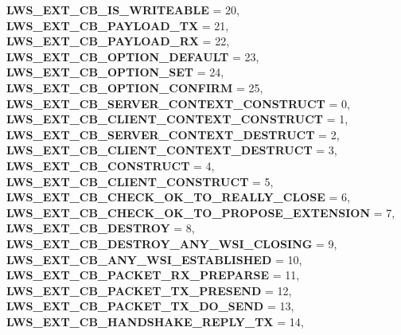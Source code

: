 \begin{DoxyCompactItemize}
\newline
{\bfseries L\+W\+S\+\_\+\+E\+X\+T\+\_\+\+C\+B\+\_\+\+I\+S\+\_\+\+W\+R\+I\+T\+E\+A\+B\+LE} = 20, 
{\bfseries L\+W\+S\+\_\+\+E\+X\+T\+\_\+\+C\+B\+\_\+\+P\+A\+Y\+L\+O\+A\+D\+\_\+\+TX} = 21, 
{\bfseries L\+W\+S\+\_\+\+E\+X\+T\+\_\+\+C\+B\+\_\+\+P\+A\+Y\+L\+O\+A\+D\+\_\+\+RX} = 22, 
{\bfseries L\+W\+S\+\_\+\+E\+X\+T\+\_\+\+C\+B\+\_\+\+O\+P\+T\+I\+O\+N\+\_\+\+D\+E\+F\+A\+U\+LT} = 23, 
\newline
{\bfseries L\+W\+S\+\_\+\+E\+X\+T\+\_\+\+C\+B\+\_\+\+O\+P\+T\+I\+O\+N\+\_\+\+S\+ET} = 24, 
{\bfseries L\+W\+S\+\_\+\+E\+X\+T\+\_\+\+C\+B\+\_\+\+O\+P\+T\+I\+O\+N\+\_\+\+C\+O\+N\+F\+I\+RM} = 25, 
{\bfseries L\+W\+S\+\_\+\+E\+X\+T\+\_\+\+C\+B\+\_\+\+S\+E\+R\+V\+E\+R\+\_\+\+C\+O\+N\+T\+E\+X\+T\+\_\+\+C\+O\+N\+S\+T\+R\+U\+CT} = 0, 
{\bfseries L\+W\+S\+\_\+\+E\+X\+T\+\_\+\+C\+B\+\_\+\+C\+L\+I\+E\+N\+T\+\_\+\+C\+O\+N\+T\+E\+X\+T\+\_\+\+C\+O\+N\+S\+T\+R\+U\+CT} = 1, 
\newline
{\bfseries L\+W\+S\+\_\+\+E\+X\+T\+\_\+\+C\+B\+\_\+\+S\+E\+R\+V\+E\+R\+\_\+\+C\+O\+N\+T\+E\+X\+T\+\_\+\+D\+E\+S\+T\+R\+U\+CT} = 2, 
{\bfseries L\+W\+S\+\_\+\+E\+X\+T\+\_\+\+C\+B\+\_\+\+C\+L\+I\+E\+N\+T\+\_\+\+C\+O\+N\+T\+E\+X\+T\+\_\+\+D\+E\+S\+T\+R\+U\+CT} = 3, 
{\bfseries L\+W\+S\+\_\+\+E\+X\+T\+\_\+\+C\+B\+\_\+\+C\+O\+N\+S\+T\+R\+U\+CT} = 4, 
{\bfseries L\+W\+S\+\_\+\+E\+X\+T\+\_\+\+C\+B\+\_\+\+C\+L\+I\+E\+N\+T\+\_\+\+C\+O\+N\+S\+T\+R\+U\+CT} = 5, 
\newline
{\bfseries L\+W\+S\+\_\+\+E\+X\+T\+\_\+\+C\+B\+\_\+\+C\+H\+E\+C\+K\+\_\+\+O\+K\+\_\+\+T\+O\+\_\+\+R\+E\+A\+L\+L\+Y\+\_\+\+C\+L\+O\+SE} = 6, 
{\bfseries L\+W\+S\+\_\+\+E\+X\+T\+\_\+\+C\+B\+\_\+\+C\+H\+E\+C\+K\+\_\+\+O\+K\+\_\+\+T\+O\+\_\+\+P\+R\+O\+P\+O\+S\+E\+\_\+\+E\+X\+T\+E\+N\+S\+I\+ON} = 7, 
{\bfseries L\+W\+S\+\_\+\+E\+X\+T\+\_\+\+C\+B\+\_\+\+D\+E\+S\+T\+R\+OY} = 8, 
{\bfseries L\+W\+S\+\_\+\+E\+X\+T\+\_\+\+C\+B\+\_\+\+D\+E\+S\+T\+R\+O\+Y\+\_\+\+A\+N\+Y\+\_\+\+W\+S\+I\+\_\+\+C\+L\+O\+S\+I\+NG} = 9, 
\newline
{\bfseries L\+W\+S\+\_\+\+E\+X\+T\+\_\+\+C\+B\+\_\+\+A\+N\+Y\+\_\+\+W\+S\+I\+\_\+\+E\+S\+T\+A\+B\+L\+I\+S\+H\+ED} = 10, 
{\bfseries L\+W\+S\+\_\+\+E\+X\+T\+\_\+\+C\+B\+\_\+\+P\+A\+C\+K\+E\+T\+\_\+\+R\+X\+\_\+\+P\+R\+E\+P\+A\+R\+SE} = 11, 
{\bfseries L\+W\+S\+\_\+\+E\+X\+T\+\_\+\+C\+B\+\_\+\+P\+A\+C\+K\+E\+T\+\_\+\+T\+X\+\_\+\+P\+R\+E\+S\+E\+ND} = 12, 
{\bfseries L\+W\+S\+\_\+\+E\+X\+T\+\_\+\+C\+B\+\_\+\+P\+A\+C\+K\+E\+T\+\_\+\+T\+X\+\_\+\+D\+O\+\_\+\+S\+E\+ND} = 13, 
\newline
{\bfseries L\+W\+S\+\_\+\+E\+X\+T\+\_\+\+C\+B\+\_\+\+H\+A\+N\+D\+S\+H\+A\+K\+E\+\_\+\+R\+E\+P\+L\+Y\+\_\+\+TX} = 14, 

\end{DoxyCompactItemize}
